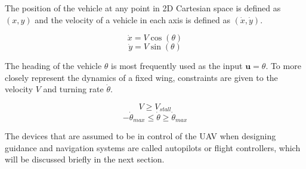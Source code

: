 \documentclass[numbered,pdftex]{ohio-etd}
\begin{document}


The position of the vehicle at any point in 2D Cartesian space is defined as $(x,y)$ and the velocity of a vehicle in each axis is defined as $(\dot{x},\dot{y})$.

\begin{equation}
\label{dubinsx}
\dot{x} = V\cos(\theta)
\end{equation}
\begin{equation}
\label{dubinsy}
\dot{y} = V\sin(\theta)
\end{equation}


The heading of the vehicle $\theta$ is most frequently used as the input $\boldsymbol{u} = \theta$. To more closely represent the dynamics of a fixed wing, constraints are given to the velocity $V$ and turning rate $\dot{\theta}$. 



\begin{equation}\label{minVel}
V \geq V_{stall}
\end{equation}
\begin{equation}\label{headingRate}
-\dot{\theta}_{max} \leq \dot{\theta} \geq \dot{\theta}_{max}
\end{equation}

The devices that are assumed to be in control of the UAV when designing guidance and navigation systems are called autopilots or flight controllers, which will be discussed briefly in the next section. 
\end{document}

